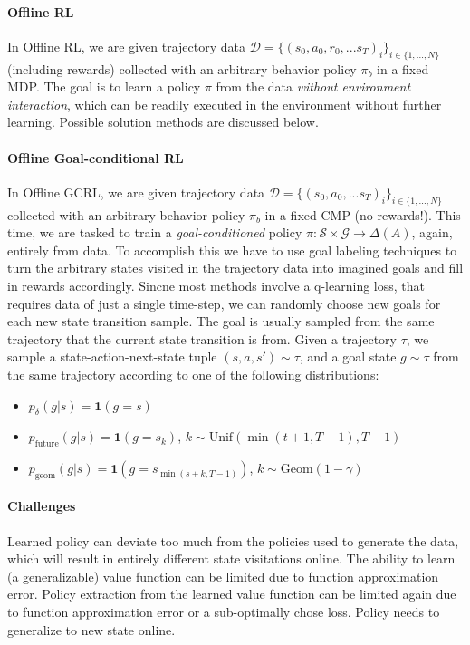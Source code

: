 \documentclass{article}
\theoremstyle{plain}
\theoremstyle{definition}
\theoremstyle{remark}
\newcommand{\sS}{\mathcal{S}}
\newcommand{\dist}[1]{\Delta({#1})}
\begin{document}
\paragraph{Offline RL} In Offline RL, we are given trajectory data $\mathcal{D} = \{(s_0,a_0,r_0, ...s_T)_i\}_{i\in\{1,...,N\}}$ (including rewards) collected with an arbitrary behavior policy $\pi_b$ in a fixed MDP. The goal is to learn a policy $\pi$ from the data \textit{without environment interaction}, which can be readily executed in the environment without further learning. Possible solution methods are discussed below.

\paragraph{Offline Goal-conditional RL} In Offline GCRL, we are given trajectory data $\mathcal{D} = \{(s_0,a_0, ...s_T)_i\}_{i\in\{1,...,N\}}$ collected with an arbitrary behavior policy $\pi_b$ in a fixed CMP (no rewards!). This time, we are tasked to train a \textit{goal-conditioned} policy $\pi:\sS\times\mathcal{G} \to \dist A$, again, entirely from data. To accomplish this we have to use goal labeling techniques to turn the arbitrary states visited in the trajectory data into imagined goals and fill in rewards accordingly. Sincne most methods involve a q-learning loss, that requires data of just a single time-step, we can randomly choose new goals for each new state transition sample. The goal is usually sampled from the same trajectory that the current state transition is from. Given a trajectory $\tau$, we sample a state-action-next-state tuple $(s,a,s')\sim\tau$, and a goal state $g\sim\tau$ from the same trajectory according to one of the following distributions:
\begin{itemize}
    \item $p_\delta(g|s) = \mathbf{1}(g=s)$
    \item $p_\mathrm{future}(g|s) = \mathbf{1}(g=s_k)$, $k\sim\mathrm{Unif}(\min(t+1,T-1), T-1)$
    \item $p_\mathrm{geom}(g|s) = \mathbf{1}(g=s_{\min(s+k, T-1)})$, $k\sim\mathrm{Geom}(1-\gamma)$
\end{itemize}

\paragraph{Challenges} Learned policy can deviate too much from the policies used to generate the data, which will result in entirely different state visitations online. The ability to learn (a generalizable) value function can be limited due to function approximation error. Policy extraction from the learned value function can be limited again due to function approximation error or a sub-optimally chose loss. Policy needs to generalize to new state online.
\end{document}
